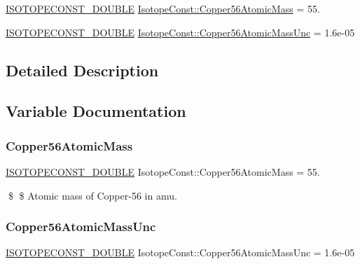 \begin{DoxyCompactItemize}
\item 
\mbox{\hyperlink{group___isotope_const-_macros_ga8f45a7272ce02c0b4c65c44636ed719a}{I\+S\+O\+T\+O\+P\+E\+C\+O\+N\+S\+T\+\_\+\+D\+O\+U\+B\+LE}} \mbox{\hyperlink{group___isotope_const-_copper-_cu56_ga2201155a8b8c7d4113f827a8454d9b56}{Isotope\+Const\+::\+Copper56\+Atomic\+Mass}} = 55.
\item 
\mbox{\hyperlink{group___isotope_const-_macros_ga8f45a7272ce02c0b4c65c44636ed719a}{I\+S\+O\+T\+O\+P\+E\+C\+O\+N\+S\+T\+\_\+\+D\+O\+U\+B\+LE}} \mbox{\hyperlink{group___isotope_const-_copper-_cu56_ga87683b26fa7b2f9bbf133e7c9037d0b1}{Isotope\+Const\+::\+Copper56\+Atomic\+Mass\+Unc}} = 1.\+6e-\/05
\end{DoxyCompactItemize}


\subsection{Detailed Description}


\subsection{Variable Documentation}
\mbox{\label{group___isotope_const-_copper-_cu56_ga2201155a8b8c7d4113f827a8454d9b56}} 
\subsubsection{\texorpdfstring{Copper56\+Atomic\+Mass}{Copper56AtomicMass}}
{\footnotesize\ttfamily \mbox{\hyperlink{group___isotope_const-_macros_ga8f45a7272ce02c0b4c65c44636ed719a}{I\+S\+O\+T\+O\+P\+E\+C\+O\+N\+S\+T\+\_\+\+D\+O\+U\+B\+LE}} Isotope\+Const\+::\+Copper56\+Atomic\+Mass = 55.}

\$ \$ Atomic mass of Copper-\/56 in amu. \mbox{\label{group___isotope_const-_copper-_cu56_ga87683b26fa7b2f9bbf133e7c9037d0b1}} 
\subsubsection{\texorpdfstring{Copper56\+Atomic\+Mass\+Unc}{Copper56AtomicMassUnc}}
{\footnotesize\ttfamily \mbox{\hyperlink{group___isotope_const-_macros_ga8f45a7272ce02c0b4c65c44636ed719a}{I\+S\+O\+T\+O\+P\+E\+C\+O\+N\+S\+T\+\_\+\+D\+O\+U\+B\+LE}} Isotope\+Const\+::\+Copper56\+Atomic\+Mass\+Unc = 1.\+6e-\/05}

